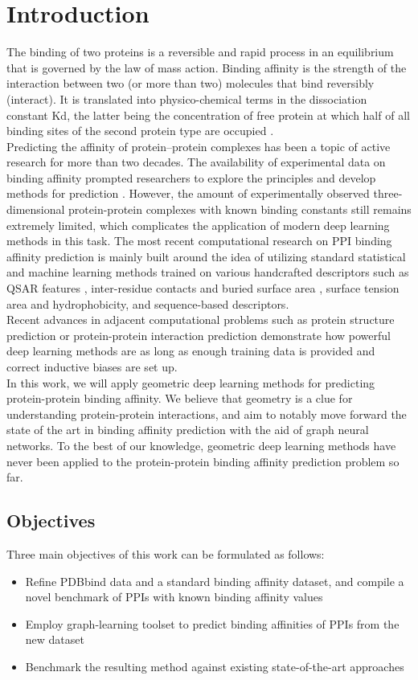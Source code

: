\section{Introduction}
The binding of two proteins is a reversible and rapid process in an equilibrium that is
governed by the law of mass action. Binding affinity is the strength of the interaction between two
(or more than two) molecules that bind reversibly (interact). It is translated into physico-chemical
terms in the dissociation constant Kd, the latter being the concentration of free protein at which
half of all binding sites of the second protein type are occupied \cite{Kastritis}. \\
Predicting the affinity of protein–protein complexes has been a topic of active research for more
than two decades. The availability of experimental data on binding affinity prompted researchers to
explore the principles and develop methods for prediction \cite{Gromiha}. However, the amount of experimentally
observed three-dimensional protein-protein complexes with known binding constants still remains
extremely limited, which complicates the application of modern deep learning methods in this
task. The most recent computational research on PPI binding affinity prediction is mainly built
around the idea of utilizing standard statistical and machine learning methods
trained on various handcrafted descriptors such as QSAR features \cite{Yang}, inter-residue contacts and
buried surface area , surface tension area and hydrophobicity, and sequence-based descriptors. \\
Recent advances in adjacent computational problems such as protein structure prediction or
protein-protein interaction prediction demonstrate how powerful deep learning methods are as long as enough training data is provided and correct inductive biases are set up. \\
In this work, we will apply geometric deep learning methods for predicting protein-protein binding
affinity. We believe that geometry is a clue for understanding protein-protein interactions, and aim
to notably move forward the state of the art in binding affinity prediction with the aid of graph
neural networks. To the best of our knowledge, geometric deep learning methods have never been
applied to the protein-protein binding affinity prediction problem so far.
\subsection{Objectives}
Three main objectives of this work can be formulated as follows:
\begin{itemize}
\item[] Refine PDBbind \cite{database} data and a standard binding affinity dataset, and compile a novel
benchmark of PPIs with known binding affinity values
\item[] Employ graph-learning toolset to predict binding affinities of PPIs from the new dataset
\item[] Benchmark the resulting method against existing state-of-the-art approaches
\end{itemize}

